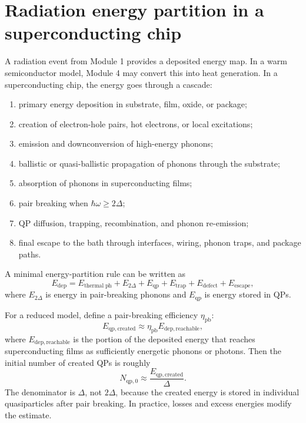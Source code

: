 \documentclass[11pt]{article}
\newcommand{\Edep}{E_{\mathrm{dep}}}
\newcommand{\xiPB}{\eta_{\mathrm{pb}}}
\begin{document}
\section{Radiation energy partition in a superconducting chip}

A radiation event from Module 1 provides a deposited energy map. In a warm semiconductor model, Module 4 may convert this into heat generation. In a superconducting chip, the energy goes through a cascade:
\begin{enumerate}[label=\arabic*.]
\item primary energy deposition in substrate, film, oxide, or package;
\item creation of electron-hole pairs, hot electrons, or local excitations;
\item emission and downconversion of high-energy phonons;
\item ballistic or quasi-ballistic propagation of phonons through the substrate;
\item absorption of phonons in superconducting films;
\item pair breaking when \(\hbar\omega\ge2\Delta\);
\item QP diffusion, trapping, recombination, and phonon re-emission;
\item final escape to the bath through interfaces, wiring, phonon traps, and package paths.
\end{enumerate}

A minimal energy-partition rule can be written as
\begin{equation}
\Edep = E_{\mathrm{thermal\;ph}}+E_{2\Delta}+E_{\mathrm{qp}}+E_{\mathrm{trap}}+E_{\mathrm{defect}}+E_{\mathrm{escape}},
\label{eq:partition}
\end{equation}
where \(E_{2\Delta}\) is energy in pair-breaking phonons and \(E_{\mathrm{qp}}\) is energy stored in QPs.

For a reduced model, define a pair-breaking efficiency \(\xiPB\):
\begin{equation}
E_{\mathrm{qp,created}} \approx \xiPB E_{\mathrm{dep,reachable}},
\label{eq:pair_efficiency}
\end{equation}
where \(E_{\mathrm{dep,reachable}}\) is the portion of the deposited energy that reaches superconducting films as sufficiently energetic phonons or photons. Then the initial number of created QPs is roughly
\begin{equation}
N_{\mathrm{qp,0}}\approx \frac{E_{\mathrm{qp,created}}}{\Delta}.
\label{eq:Nqp_from_energy}
\end{equation}
The denominator is \(\Delta\), not \(2\Delta\), because the created energy is stored in individual quasiparticles after pair breaking. In practice, losses and excess energies modify the estimate.
\end{document}
